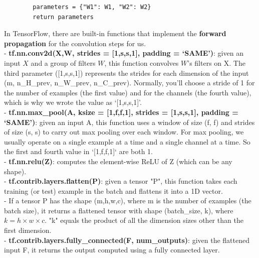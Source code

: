 \documentclass[11pt, a4paper]{article}
\begin{document}
\begin{spacing}{1.1}
\begin{lstlisting}
		parameters = {"W1": W1,	"W2": W2}
		return parameters	\end{lstlisting} \vspace{1mm}
	In TensorFlow, there are built-in functions that implement the \textbf{forward propagation} for the convolution steps for us. \vspace*{.5mm}\\
	- \textbf{tf.nn.conv2d(X,W, strides = [1,s,s,1], padding = `SAME')}: given an input $X$ and a group of filters $W$, this function convolves $W$'s filters on X. The third parameter ([1,s,s,1]) represents the strides for each dimension of the input (m, n\_H\_prev, n\_W\_prev, n\_C\_prev). Normally, you'll choose a stride of 1 for the number of examples (the first value) and for the channels (the fourth value), which is why we wrote the value as `[1,s,s,1]'. \vspace*{.5mm}\\	
	- \textbf{tf.nn.max\_pool(A, ksize = [1,f,f,1], strides = [1,s,s,1], padding = `SAME')}: given an input A, this function uses a window of size (f, f) and strides of size (s, s) to carry out max pooling over each window.  For max pooling, we usually operate on a single example at a time and a single channel at a time.  So the first and fourth value in `[1,f,f,1]` are both 1. \vspace*{.5mm}\\
	- \textbf{tf.nn.relu(Z)}: computes the element-wise ReLU of Z (which can be any shape).\vspace*{.5mm}\\	
	- \textbf{tf.contrib.layers.flatten(P)}: given a tensor "P", this function takes each training (or test) example in the batch and flattens it into a 1D vector. \vspace*{.5mm}\\
	\hspace*{3mm} - If a tensor P has the shape (m,h,w,c), where m is the number of examples (the batch size), it returns \hspace*{5mm} a flattened tensor with shape (batch\_size, k), where $k=h \times w \times c$.  "k" equals the product of all the \hspace*{5mm} dimension sizes other than the first dimension.\vspace*{.5mm}\\
	- \textbf{tf.contrib.layers.fully\_connected(F, num\_outputs)}: given the flattened input F, it returns the output computed using a fully connected layer. \vspace*{1mm}\\	

\end{spacing}
\end{document}
